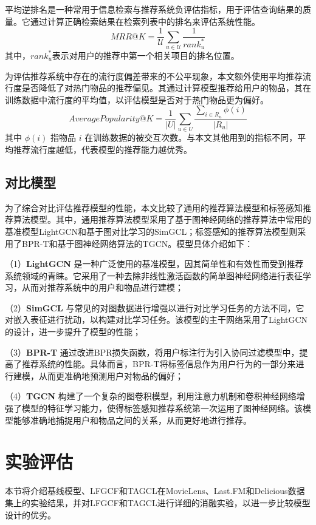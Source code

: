 平均逆排名是一种常用于信息检索与推荐系统负评估指标，用于评估查询结果的质量。它通过计算正确检索结果在检索列表中的排名来评估系统性能。
\begin{equation}
  MRR@K = \frac{1}{\mathcal{U}} \sum_{u \in \mathcal{U}}\frac{1}{rank_u^*}
\end{equation}
其中，$rank_u^*$表示对用户的推荐中第一个相关项目的排名位置。

为评估推荐系统中存在的流行度偏差带来的不公平现象，本文额外使用平均推荐流行度是否降低了对热门物品的推荐偏见。其通过计算模型推荐给用户的物品，其在训练数据中流行度的平均值，以评估模型是否对于热门物品更为偏好。
\begin{equation}
  AveragePopularity@K=\frac{1}{|U|} \sum_{u \in U } \frac{\sum_{i \in R_{u}} \phi(i)}{|R_{u}|}
\end{equation}
其中 $\phi(i)$ 指物品 $i$ 在训练数据的被交互次数。与本文其他用到的指标不同，平均推荐流行度越低，代表模型的推荐能力越优秀。

\subsection{对比模型}
为了综合对比评估推荐模型的性能，本文比较了通用的推荐算法模型和标签感知推荐算法模型。其中，通用推荐算法模型采用了基于图神经网络的推荐算法中常用的基准模型LightGCN\cite{he_lightgcn_2020}和基于图对比学习的SimGCL\cite{yu_simgcl_2022}；标签感知的推荐算法模型则采用了BPR-T\cite{li_tag-aware_2019}和基于图神经网络算法的TGCN\cite{chen_tgcn_2020}。模型具体介绍如下：

（1）\textbf{LightGCN} 是一种广泛使用的基准模型，因其简单性和有效性而受到推荐系统领域的青睐。它采用了一种去除非线性激活函数的简单图神经网络进行表征学习，从而对推荐系统中的用户和物品进行建模；

（2）\textbf{SimGCL} 与常见的对图数据进行增强以进行对比学习任务的方法不同，它对嵌入表征进行扰动，以构建对比学习任务。该模型的主干网络采用了LightGCN的设计，进一步提升了模型的性能；

（3）\textbf{BPR-T} 通过改进BPR损失函数，将用户标注行为引入协同过滤模型中，提高了推荐系统的性能。具体而言，BPR-T将标签信息作为用户行为的一部分来进行建模，从而更准确地预测用户对物品的偏好；

（4）\textbf{TGCN} 构建了一个复杂的图卷积模型，利用注意力机制和卷积神经网络增强了模型的特征学习能力，使得标签感知推荐系统第一次运用了图神经网络。该模型能够准确地捕捉用户和物品之间的关系，从而更好地进行推荐。

\section{实验评估}
本节将介绍基线模型、LFGCF和TAGCL在MovieLens、Last.FM和Delicious数据集上的实验结果，并对LFGCF和TAGCL进行详细的消融实验，以进一步比较模型设计的优劣。

